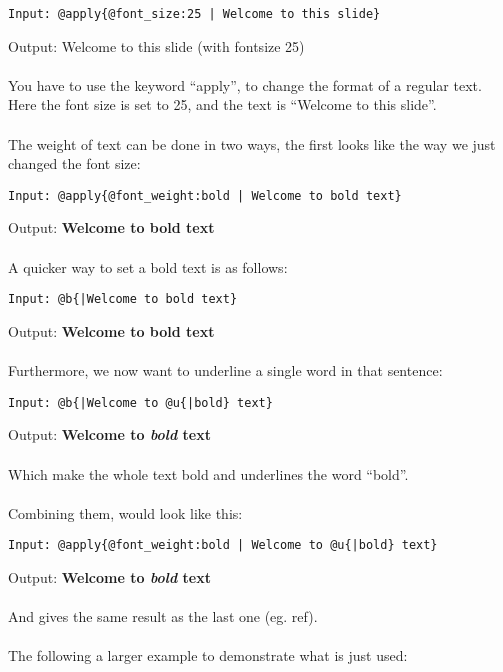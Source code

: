 \begin{verbatim}
Input: @apply{@font_size:25 | Welcome to this slide}
\end{verbatim}

Output: Welcome to this slide (with fontsize 25)
\\ \\
You have to use the keyword ``apply'', to change the format of a regular text. Here the font size is set to 25, and the text is ``Welcome to this slide''.
\\ \\
The weight of text can be done in two ways, the first looks like the way we just changed the font size:

\begin{verbatim}
Input: @apply{@font_weight:bold | Welcome to bold text}
\end{verbatim}

Output: \textbf{Welcome to bold text}
\\ \\
A quicker way to set a bold text is as follows:

\begin{verbatim}
Input: @b{|Welcome to bold text}
\end{verbatim}


Output: \textbf{Welcome to bold text}
\\ \\
Furthermore, we now want to underline a single word in that sentence:

\begin{verbatim}
Input: @b{|Welcome to @u{|bold} text}
\end{verbatim}

Output: \textbf{Welcome to \textit{bold} text}
\\ \\
Which make the whole text bold and underlines the word ``bold''.
\\ \\
Combining them, would look like this:

\begin{verbatim}
Input: @apply{@font_weight:bold | Welcome to @u{|bold} text}
\end{verbatim}

Output: \textbf{Welcome to \textit{bold} text}
\\ \\
And gives the same result as the last one (eg. ref).
\\ \\
The following a larger example to demonstrate what is just used:

